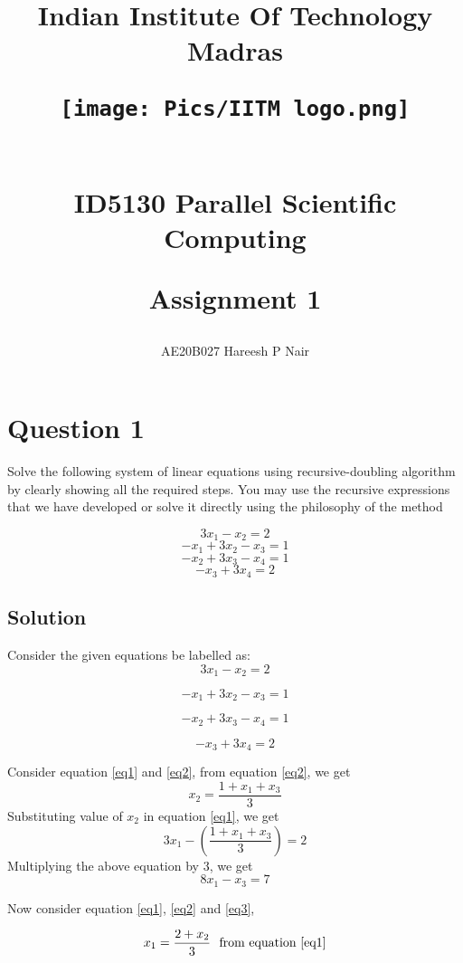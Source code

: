 \documentclass[12pt]{article}
\title{

    Indian Institute Of Technology Madras
    \begin{figure}[htp]
        \centering
        \texttt{[image: Pics/IITM logo.png]}
    \end{figure}
    \begin{center}
        \textbf{\\ID5130 Parallel Scientific Computing\\}
        
       Assignment 1
    \end{center}
}
\author{
    AE20B027 Hareesh P Nair\\ 
}
\date{}
\begin{document}
\maketitle
\newpage
{}


\newpage

\section*{Question 1}
Solve the following system of linear equations using recursive-doubling algorithm by clearly showing all the required steps. You may use the recursive expressions that we have developed or solve it directly using the philosophy of the method

$$3x_1 - x_2 = 2$$
$$-x_1+3x_2-x_3=1$$
$$-x_2+3x_3-x_4=1$$
$$-x_3+3x_4=2$$

\subsection*{Solution}

Consider the given equations be labelled as:
\begin{equation}
    3x_1 - x_2 = 2
    \label{eq1}
\end{equation}

\begin{equation}
    -x_1+3x_2-x_3=1
    \label{eq2}
\end{equation}

\begin{equation}
    -x_2+3x_3-x_4=1
    \label{eq3}
\end{equation}

\begin{equation}
    -x_3+3x_4=2
    \label{eq4}
\end{equation}

\noindent Consider equation \eqref{eq1} and \eqref{eq2}, from equation \eqref{eq2}, we get
$$x_2 = \frac{1+x_1+x_3}{3}$$
\noindent Substituting value of $x_2$ in equation \eqref{eq1}, we get
$$3x_1 - \left( \frac{1+x_1+x_3}{3}\right) = 2$$
\noindent Multiplying the above equation by $3$, we get
\begin{equation}
    8x_1-x_3 = 7
    \label{eq5}
\end{equation}

\noindent Now consider equation \eqref{eq1}, \eqref{eq2} and \eqref{eq3},

$$x_1 = \frac{2+x_2}{3} \text{\ \ from equation \eqref{eq1}}$$
\end{document}
